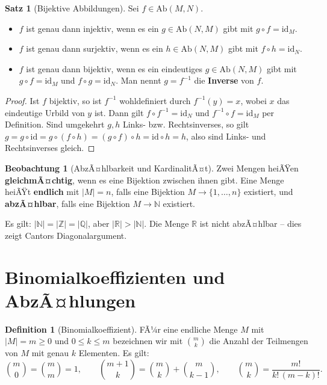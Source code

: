 ﻿\documentclass[a4paper,12pt]{report}
\theoremstyle{definition}
\newtheorem{definition}{Definition}
\newtheorem{satz}{Satz}
\newtheorem{beobachtung}{Beobachtung}
\begin{document}
\begin{satz}[Bijektive Abbildungen]
    Sei $f \in \mathrm{Ab}(M, N)$.
    \begin{itemize}
        \item[-] $f$ ist genau dann injektiv, wenn es ein $g \in \mathrm{Ab}(N, M)$
              gibt mit $g \circ f = \mathrm{id}_M$.
        \item[-] $f$ ist genau dann surjektiv, wenn es ein $h \in \mathrm{Ab}(N, M)$
              gibt mit $f \circ h = \mathrm{id}_N$.
        \item[-] $f$ ist genau dann bijektiv, wenn es ein eindeutiges $g \in \mathrm{Ab}(N, M)$
              gibt mit $g \circ f = \mathrm{id}_M$ und $f \circ g = \mathrm{id}_N$.
              Man nennt $g = f^{-1}$ die \textbf{Inverse} von $f$.
    \end{itemize}
\end{satz}
\begin{proof}
    Ist $f$ bijektiv, so ist $f^{-1}$ wohldefiniert durch $f^{-1}(y) = x$, wobei
    $x$ das eindeutige Urbild von $y$ ist. Dann gilt $f \circ f^{-1} = \mathrm{id}_N$
    und $f^{-1} \circ f = \mathrm{id}_M$ per Definition.
    Sind umgekehrt $g, h$ Links- bzw. Rechtsinverses, so gilt
    $g = g \circ \mathrm{id} = g \circ (f \circ h) = (g \circ f) \circ h
    = \mathrm{id} \circ h = h$,
    also sind Links- und Rechtsinverses gleich.
\end{proof}


\begin{beobachtung}[AbzÃ¤hlbarkeit und KardinalitÃ¤t]
    Zwei Mengen heiÃŸen \textbf{gleichmÃ¤chtig}, wenn es eine Bijektion zwischen
    ihnen gibt. Eine Menge heiÃŸt \textbf{endlich} mit $|M| = n$, falls eine
    Bijektion $M \to \{1, \dots, n\}$ existiert, und \textbf{abzÃ¤hlbar}, falls
    eine Bijektion $M \to \mathbb{N}$ existiert.

    Es gilt: $|\mathbb{N}| = |\mathbb{Z}| = |\mathbb{Q}|$, aber $|\mathbb{R}| > |\mathbb{N}|$.
    Die Menge $\mathbb{R}$ ist nicht abzÃ¤hlbar -- dies zeigt Cantors
    Diagonalargument.
\end{beobachtung}

\section{Binomialkoeffizienten und AbzÃ¤hlungen}

\begin{definition}[Binomialkoeffizient]
    FÃ¼r eine endliche Menge $M$ mit $|M| = m \ge 0$ und $0 \le k \le m$
    bezeichnen wir mit $\binom{m}{k}$ die Anzahl der Teilmengen von $M$ mit
    genau $k$ Elementen. Es gilt:
    \[
        \binom{m}{0} = \binom{m}{m} = 1, \qquad
        \binom{m+1}{k} = \binom{m}{k} + \binom{m}{k-1}, \qquad
        \binom{m}{k} = \frac{m!}{k!\,(m-k)!}.
    \]
\end{definition}
\end{document}
